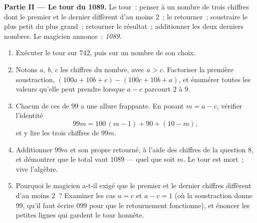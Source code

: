 \begin{problem}
\medskip
\noindent\textbf{Partie II --- Le tour du 1089.}
Le tour~: penser à un nombre de trois chiffres dont le premier et le
dernier diffèrent d'au moins $2$~; le retourner~; soustraire le plus
petit du plus grand~; retourner le résultat~; additionner les deux
derniers nombres. Le magicien annonce~: \emph{1089}.
\begin{enumerate}[resume]
  \item Exécuter le tour sur $742$, puis sur un nombre de son choix.
  \item Notons $a$, $b$, $c$ les chiffres du nombre, avec $a > c$.
        Factoriser la première soustraction,
        $(100a + 10b + c) - (100c + 10b + a)$, et énumérer toutes
        les valeurs qu'elle peut prendre lorsque $a - c$ parcourt
        $2$ à $9$.
  \item Chacun de ces  de $99$ a une allure frappante. En
        posant $m = a - c$, vérifier l'identité
        \[
        99m = 100\,(m - 1) + 90 + (10 - m),
        \]
        et y lire les trois chiffres de $99m$.
  \item Additionner $99m$ et son propre retourné, à l'aide des
        chiffres de la question 8, et démontrer que le total vaut
        $1089$ --- quel que soit $m$. Le tour est mort~; vive
        l'algèbre.
  \item Pourquoi le magicien a-t-il exigé que le premier et le
        dernier chiffres diffèrent d'au moins $2$~? Examiner les cas
        $a = c$ et $a - c = 1$ (où la soustraction donne $99$, qu'il
        faut écrire $099$ pour que le retournement fonctionne), et
        énoncer les petites lignes qui gardent le tour honnête.
\end{enumerate}


\end{problem}
